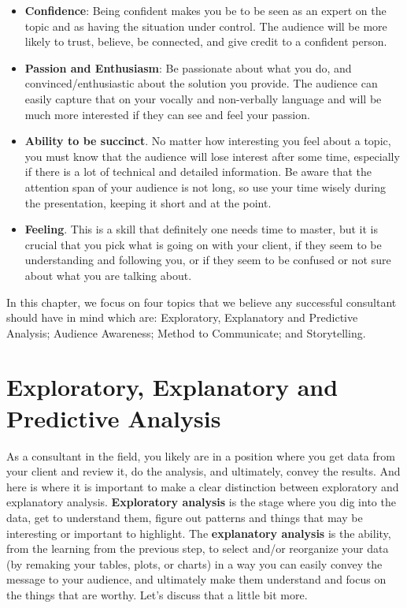 \documentclass[
]{krantz}
\providecommand{\tightlist}{%
  \setlength{\itemsep}{0pt}\setlength{\parskip}{0pt}}
\begin{document}
\begin{itemize}
\tightlist
\item
  \textbf{Confidence}: Being confident makes you be to be seen as an expert on the topic and as having the situation under control. The audience will be more likely to trust, believe, be connected, and give credit to a confident person.
\item
  \textbf{Passion and Enthusiasm}: Be passionate about what you do, and convinced/enthusiastic about the solution you provide. The audience can easily capture that on your vocally and non-verbally language and will be much more interested if they can see and feel your passion.
\item
  \textbf{Ability to be succinct}. No matter how interesting you feel about a topic, you must know that the audience will lose interest after some time, especially if there is a lot of technical and detailed information. Be aware that the attention span of your audience is not long, so use your time wisely during the presentation, keeping it short and at the point.
\item
  \textbf{Feeling}. This is a skill that definitely one needs time to master, but it is crucial that you pick what is going on with your client, if they seem to be understanding and following you, or if they seem to be confused or not sure about what you are talking about.
\end{itemize}

In this chapter, we focus on four topics that we believe any successful consultant should have in mind which are: Exploratory, Explanatory and Predictive Analysis; Audience Awareness; Method to Communicate; and Storytelling.

\hypertarget{exploratory-explanatory-and-predictive-analysis}{%
\section{Exploratory, Explanatory and Predictive Analysis}\label{exploratory-explanatory-and-predictive-analysis}}

As a consultant in the field, you likely are in a position where you get data from your client and review it, do the analysis, and ultimately, convey the results. And here is where it is important to make a clear distinction between exploratory and explanatory analysis. \textbf{Exploratory analysis} is the stage where you dig into the data, get to understand them, figure out patterns and things that may be interesting or important to highlight. The \textbf{explanatory analysis} is the ability, from the learning from the previous step, to select and/or reorganize your data (by remaking your tables, plots, or charts) in a way you can easily convey the message to your audience, and ultimately make them understand and focus on the things that are worthy. Let's discuss that a little bit more.
\end{document}
